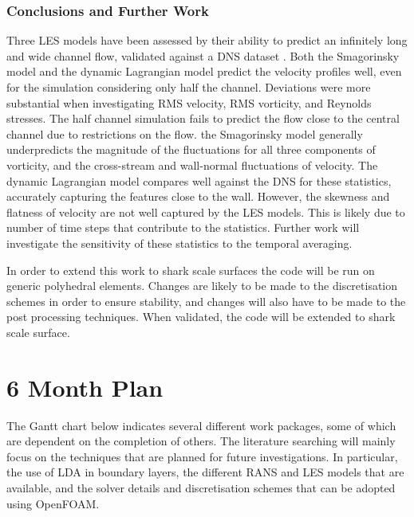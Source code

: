 \documentclass[12pt,oneside,a4paper]{article}
\begin{document}
\subsubsection{Conclusions and Further Work}
Three LES models have been assessed by their ability to predict an infinitely long and wide channel flow, validated against a DNS dataset \citep{vreman2014}. Both the Smagorinsky model \citep{smagorinsky1963} and the dynamic Lagrangian model \citep{meneveau1996} predict the velocity profiles well, even for the simulation considering only half the channel. Deviations were more substantial when investigating RMS velocity, RMS vorticity, and Reynolds stresses. The half channel simulation fails to predict the flow close to the central channel due to restrictions on the flow. the Smagorinsky model generally underpredicts the magnitude of the fluctuations for all three components of vorticity, and the cross-stream and wall-normal fluctuations of velocity. The dynamic Lagrangian model compares well against the DNS for these statistics, accurately capturing the features close to the wall. However, the skewness and flatness of velocity are not well captured by the LES models. This is likely due to number of time steps that contribute to the statistics. Further work will investigate the sensitivity of these statistics to the temporal averaging.

In order to extend this work to shark scale surfaces the code will be run on generic polyhedral elements. Changes are likely to be made to the discretisation schemes in order to ensure stability, and changes will also have to be made to the post processing techniques. When validated, the code will be extended to shark scale surface. 

\section{6 Month Plan}
The Gantt chart below indicates several different work packages, some of which are dependent on the completion of others. The literature searching will mainly focus on the techniques that are planned for future investigations. In particular, the use of LDA in boundary layers, the different RANS and LES models that are available, and the solver details and discretisation schemes that can be adopted using OpenFOAM. 
\end{document}
